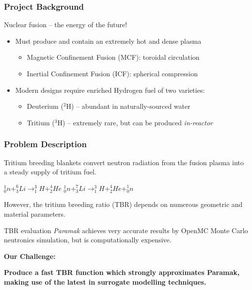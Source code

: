 \begin{frame}
	\frametitle{Project Background}
	Nuclear fusion -- the energy of the future!
    \vspace{10pt}
	\begin{itemize}
	    \item Must produce and contain an extremely hot and dense plasma
	    \begin{itemize}
		    \item Magnetic Confinement Fusion (MCF): toroidal circulation
		    \item Inertial Confinement Fusion (ICF): spherical compression
		\end{itemize}
		\vspace{10pt}
		\item Modern designs require enriched Hydrogen fuel of two varieties:
	    \begin{itemize}
		    \item Deuterium ($^2$H) -- abundant in naturally-sourced water
		    \item Tritium ($^3$H) -- extremely rare, but can be produced \textit{in-reactor}
		\end{itemize}
	\end{itemize}
	\vspace{10pt}
\end{frame}

\begin{frame}
	\frametitle{Problem Description}
	Tritium breeding blankets convert neutron radiation from the fusion plasma into a steady supply of tritium fuel.
	\begin{center}
	$^1_0n + ^6_3Li \rightarrow ^3_1H + ^4_2He$ \hspace{20pt} $^1_0n + ^7_3Li \rightarrow ^3_1H + ^4_2He + ^1_0n$
	\end{center}
	However, the tritium breeding ratio (TBR) depends on numerous geometric and material parameters.\newline
	
	TBR evaluation \textit{Paramak} achieves very accurate results by OpenMC Monte Carlo neutronics simulation, but is computationally expensive.
	
	\vspace{15pt}
	
	\begin{center}
	    \textbf{Our Challenge:}
	\end{center}
	
	\begin{center}
	    \textbf{Produce a fast TBR function which strongly approximates Paramak, making use of the latest in surrogate modelling techniques.}
	\end{center}
\end{frame}

